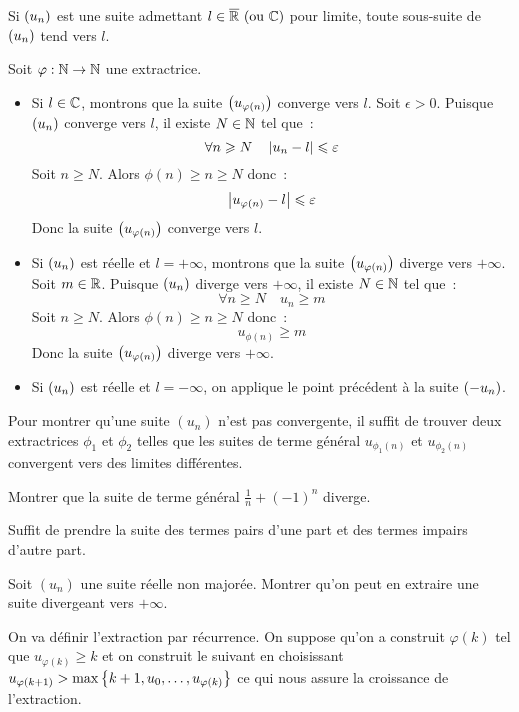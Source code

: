 \documentclass{magnolia}
\begin{document}
\begin{proposition}[utile=-3]
Si $\left(u_n\right)$ est une suite admettant $l\in\text{$\overline{\mathbb{R}}$ (ou $\mathbb{C}$)}$
pour limite, toute sous-suite de $\left(u_n\right)$ tend vers $l$. 
\end{proposition}



\begin{preuve}
Soit $\varphi:\mathbb{N}\to\mathbb{N}$ une extractrice.
\begin{itemize}
\item Si $l\in\mathbb{C}$, montrons que la suite $\left(u_{\varphi(n)}\right)$ converge vers $l$.
  Soit $\epsilon>0$. Puisque $\left(u_n\right)$ converge vers $l$, il existe $N\in\mathbb{N}$
  tel que~:
  \[\forall n\geqslant N \quad \left|u_n-l\right|\leqslant\varepsilon\]
  Soit $n\geq N$. Alors $\phi(n)\geq n\geq N$ donc~:
  \[\left|u_{\varphi(n)}-l\right|\leqslant\varepsilon\]
  Donc la suite $\left(u_{\varphi(n)}\right)$ converge vers $l$.
\item Si $\left(u_n\right)$ est réelle et $l=+\infty$, montrons que la suite
  $\left(u_{\varphi(n)}\right)$ diverge vers $+\infty$. Soit $m\in\mathbb{R}$. Puisque $\left(u_n\right)$
  diverge vers $+\infty$, il existe $N\in\mathbb{N}$ tel que~:
  \[\forall n\geq N \quad u_n\geq m\]
  Soit $n\geq N$. Alors $\phi(n)\geq n\geq N$ donc~:
  \[u_{\phi(n)}\geq m\]
  Donc la suite $\left(u_{\varphi(n)}\right)$ diverge vers $+\infty$.
\item Si $\left(u_n\right)$ est réelle et $l=-\infty$, on applique le point précédent
  à la suite $\left(-u_n\right)$.
\end{itemize}
\end{preuve}

\begin{remarqueUnique}
\remarque Pour montrer qu'une suite $(u_n)$ n'est pas convergente, il suffit
  de trouver deux extractrices $\phi_1$ et $\phi_2$ telles que les suites de
  terme général $u_{\phi_1(n)}$ et $u_{\phi_2(n)}$ convergent vers des limites
  différentes.
\end{remarqueUnique}

\begin{exos}
\exo Montrer que la suite de terme général $\frac{1}{n}+(-1)^n$ diverge.
\begin{sol}
Suffit de prendre la suite des termes pairs d'une part et des termes impairs d'autre part.
\end{sol}
\exo Soit $(u_n)$ une suite réelle non majorée. Montrer qu'on peut en
  extraire une suite divergeant vers $+\infty$.
  \begin{sol}
  On va définir l'extraction par récurrence. On suppose qu'on a construit $\varphi(k)$ tel que $u_{\varphi(k)}\geq k$ et on construit le suivant en choisissant $u_{\varphi(k+1)}> \max\left\{k+1,u_0,\ldots,u_{\varphi(k)}\right\}$ ce qui nous assure la croissance de l'extraction.
  \end{sol}
\end{exos}
\end{document}
